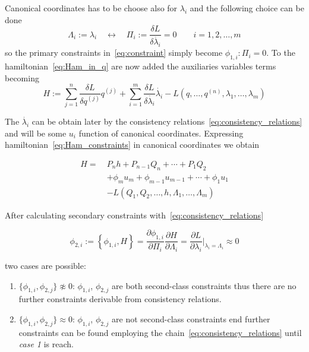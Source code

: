 Canonical coordinates has to be choose also for $\lambda_i$ and the following
choice can be done
\begin{equation} \label{eq:def_canonical_coordinates_lambda}
  \Lambda_{i}:= \lambda_{i}
  \quad \leftrightarrow \quad
  \Pi_{i} := \frac{\delta L}{\delta \dot{\lambda_{i}}} = 0
  \qquad i = 1, 2, \ldots, m
\end{equation}
so the primary constraints in~\eqref{eq:constraint} simply become
$\phi_{1, i}: \Pi_i = 0$. To the hamiltonian~\eqref{eq:Ham_in_q} are now added
the auxiliaries variables terms becoming
\begin{equation} \label{eq:Ham_constraints_in_q}
  H :=
  \sum_{j=1}^{n} \frac{\delta L}{\delta q^{(j)}} q^{(j)} +
  \sum_{i=1}^{m} \frac{\delta L}{\delta \dot{\lambda_i}} \dot{\lambda_i} -
  L(q, \ldots, q^{(n)}, \lambda_1, \ldots, \lambda_m)
\end{equation}

The $\dot{\lambda_i}$ can be obtain later by the consistency
relations~\eqref{eq:consistency_relations} and will be some $u_i$ function of
canonical coordinates. Expressing hamiltonian~\eqref{eq:Ham_constraints} in
canonical coordinates we obtain

\begin{align} \label{eq:Ham_constraints}
  H =\ & P_n h + P_{n-1} Q_n + \cdots + P_1 Q_2 \nonumber \\
       & + \phi_m u_m + \phi_{m-1} u_{m-1} + \cdots + \phi_1 u_1 \nonumber \\
       & - L ( Q_1, Q_2, \ldots, h, \Lambda_1, \ldots, \Lambda_m)
\end{align}


After calculating secondary constraints with~\eqref{eq:consistency_relations}

\begin{equation*}
  \phi_{2, i} := \left\{ \phi_{1,i}, H \right\} =
  \frac{\partial \phi_{1,i}}{\partial \Pi_i}
  \frac{\partial H}{\partial \Lambda_i} =
  \frac{\partial L}{\partial \lambda_i} \Big|_{\lambda_i = \Lambda_i}
  \approx 0
\end{equation*}

two cases are possible:

\begin{enumerate}
  \item $\{\phi_{1,i}, \phi_{2,j}\} \not\approx 0$: $\phi_{1,i}$, $\phi_{2,j}$ are
    both second-class constraints thus there are no further constraints
    derivable from consistency relations.
  \item $\{\phi_{1,i}, \phi_{2,j}\} \approx 0$: $\phi_{1,i}$, $\phi_{2,j}$ are
    not second-class constraints end further constraints can be found employing
    the chain~\eqref{eq:consistency_relations} until \emph{case 1} is reach.
\end{enumerate}

